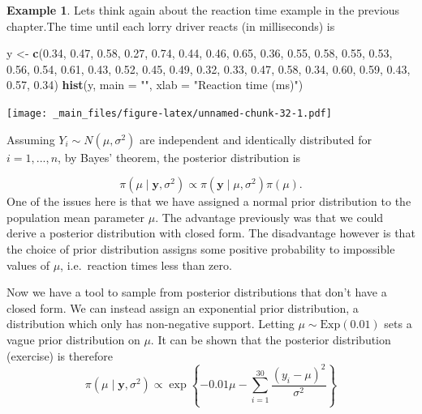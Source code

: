 \documentclass[
]{book}
\newenvironment{Shaded}{\begin{snugshade}}{\end{snugshade}}
\newcommand{\AttributeTok}[1]{\textcolor[rgb]{0.13,0.29,0.53}{#1}}
\newcommand{\FloatTok}[1]{\textcolor[rgb]{0.00,0.00,0.81}{#1}}
\newcommand{\FunctionTok}[1]{\textcolor[rgb]{0.13,0.29,0.53}{\textbf{#1}}}
\newcommand{\NormalTok}[1]{#1}
\newcommand{\OtherTok}[1]{\textcolor[rgb]{0.56,0.35,0.01}{#1}}
\newcommand{\StringTok}[1]{\textcolor[rgb]{0.31,0.60,0.02}{#1}}
\theoremstyle{definition}
\theoremstyle{definition}
\newtheorem{example}{Example}[chapter]
\theoremstyle{definition}
\theoremstyle{definition}
\theoremstyle{remark}
\begin{document}
\begin{example}
\protect\hypertarget{exm:norm}{}\label{exm:norm}Lets think again about the reaction time example in the previous chapter.The time until each lorry driver reacts (in milliseconds) is

\begin{Shaded}
\begin{Highlighting}[]
\NormalTok{y }\OtherTok{\textless{}{-}} \FunctionTok{c}\NormalTok{(}\FloatTok{0.34}\NormalTok{, }\FloatTok{0.47}\NormalTok{, }\FloatTok{0.58}\NormalTok{, }\FloatTok{0.27}\NormalTok{, }\FloatTok{0.74}\NormalTok{, }\FloatTok{0.44}\NormalTok{, }\FloatTok{0.46}\NormalTok{, }\FloatTok{0.65}\NormalTok{, }\FloatTok{0.36}\NormalTok{, }\FloatTok{0.55}\NormalTok{, }\FloatTok{0.58}\NormalTok{, }\FloatTok{0.55}\NormalTok{, }
       \FloatTok{0.53}\NormalTok{, }\FloatTok{0.56}\NormalTok{, }\FloatTok{0.54}\NormalTok{, }\FloatTok{0.61}\NormalTok{, }\FloatTok{0.43}\NormalTok{, }\FloatTok{0.52}\NormalTok{, }\FloatTok{0.45}\NormalTok{, }\FloatTok{0.49}\NormalTok{, }\FloatTok{0.32}\NormalTok{, }\FloatTok{0.33}\NormalTok{, }\FloatTok{0.47}\NormalTok{, }\FloatTok{0.58}\NormalTok{, }
       \FloatTok{0.34}\NormalTok{, }\FloatTok{0.60}\NormalTok{, }\FloatTok{0.59}\NormalTok{, }\FloatTok{0.43}\NormalTok{, }\FloatTok{0.57}\NormalTok{, }\FloatTok{0.34}\NormalTok{)}
\FunctionTok{hist}\NormalTok{(y, }\AttributeTok{main =} \StringTok{""}\NormalTok{, }\AttributeTok{xlab =} \StringTok{"Reaction time (ms)"}\NormalTok{)}
\end{Highlighting}
\end{Shaded}

\texttt{[image: \_main\_files/figure-latex/unnamed-chunk-32-1.pdf]}

Assuming \(Y_i \sim N(\mu, \sigma^2)\) are independent and identically distributed for \(i=1,...,n\), by Bayes' theorem, the posterior distribution is

\[
\pi(\mu \mid \boldsymbol{y}, \sigma^2) \propto \pi(\boldsymbol{y} \mid \mu, \sigma^2) \pi(\mu).
\]
One of the issues here is that we have assigned a normal prior distribution to the population mean parameter \(\mu\). The advantage previously was that we could derive a posterior distribution with closed form. The disadvantage however is that the choice of prior distribution assigns some positive probability to impossible values of \(\mu\), i.e.~reaction times less than zero.

Now we have a tool to sample from posterior distributions that don't have a closed form. We can instead assign an exponential prior distribution, a distribution which only has non-negative support. Letting \(\mu \sim \textrm{Exp}(0.01)\) sets a vague prior distribution on \(\mu\). It can be shown that the posterior distribution (exercise) is therefore
\[
\pi(\mu \mid \boldsymbol{y}, \sigma^2) \propto \exp\left\{-0.01\mu -\sum_{i=1}^{30}\frac{(y_i - \mu)^2}{\sigma^2}\right\} 
\]


\end{example}
\end{document}
